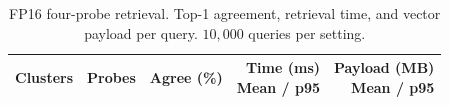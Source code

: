 \begin{table}[H]
\centering\normalsize\renewcommand{\arraystretch}{1.1}\setlength{\tabcolsep}{3.5pt}
\setlength{\arrayrulewidth}{0.3pt}
\caption{FP16 four-probe retrieval. Top-1 agreement, retrieval time, and vector payload per query. $10{,}000$ queries per setting.}
\label{tab:latency-table}
\begin{tabular}{|r|r|r|r|r|}
\hline
Clusters & Probes & Agree (\%) & \shortstack{\strut Time (ms)\\Mean / p95} & \shortstack{\strut Payload (MB)\\Mean / p95}\\\hline

\end{tabular}
\end{table}
